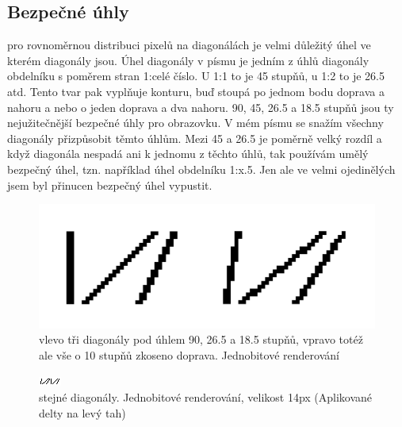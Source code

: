\documentclass[a4paper]{article}
\begin{document}
\subsection{Bezpečné úhly}
pro rovnoměrnou distribuci pixelů na diagonálách je velmi důležitý úhel ve kterém diagonály jsou. Úhel diagonály v písmu je jedním z úhlů diagonály obdelníku s poměrem stran 1:celé číslo. U 1:1 to je 45 stupňů, u 1:2 to je 26.5 atd. Tento tvar pak vyplňuje konturu, buď stoupá po jednom bodu doprava a nahoru a nebo o jeden doprava a dva nahoru.
90,
45,
26.5 a 
18.5 stupňů jsou ty nejužitečnější bezpečné úhly pro obrazovku. V mém písmu se snažím všechny diagonály přizpůsobit těmto úhlům. Mezi 45 a 26.5 je poměrně velký rozdíl a když diagonála nespadá ani k jednomu z těchto úhlů, tak používám umělý bezpečný úhel, tzn. například úhel obdelníku 1:x.5. Jen ale ve velmi ojedinělých jsem byl přinucen bezpečný úhel vypustit. 

\begin{figure}[H]
  \includegraphics[width=\linewidth]{pics/1bit.png}
  \caption{vlevo tři diagonály pod úhlem 90, 26.5 a 18.5 stupňů, vpravo totéž ale vše o 10 stupňů zkoseno doprava. Jednobitové renderování}
\end{figure}

\begin{figure}[H]
  \includegraphics[width=\linewidth]{pics/bw.png}
  \caption{stejné diagonály. Jednobitové renderování, velikost 14px (Aplikované delty na levý tah)}
\end{figure}
\end{document}
